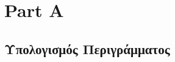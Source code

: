 \documentclass{report}
\begin{document}
\chapter{Part A}
\section{Υπολογισμός Περιγράμματος}

\clearpage
{}
\end{document}
